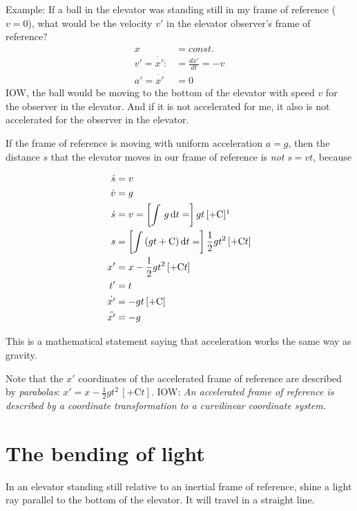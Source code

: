 \documentclass[pagesize,headsepline,10pt,parskip=half,BCOR=12mm]{scrreprt}
\begin{document}
      Example: If a ball in the elevator was standing still in my
      frame of reference ($v = 0$), what would be the velocity $v'$
      in the elevator observer's frame of reference?
      \begin{align}
        x &= const.\\
        v' = \dot{x'} :&= \frac{dx'}{dt} = -v \\
        a' = \ddot{x'} &= 0
      \end{align}
      IOW, the ball would be moving to the bottom of the elevator
      with speed $v$ for the observer in the elevator.  And if it
      is not accelerated for me, it also is not accelerated for the
      observer in the elevator.

      If the frame of reference is moving with uniform
      acceleration $a=g$, then the distance $s$ that the elevator
      moves in our frame of reference is \emph{not} $s = vt$,
      because

      \begin{align}
        \dot{s} &= v \\
        \dot{v} &= g \\
        \dot{s} &= v = \left[\int\, g\,\mathrm{d}t =\right]
        gt\,[+ \mathrm{C}]\footnotemark
        \\
        s &= \left[\int\, (gt + \mathrm{C})\,\mathrm{d}t
        =\right] \frac{1}{2} gt^2\,[+ \mathrm{C}t] \\
        x' &= x - \frac{1}{2} gt^2\,[+ \mathrm{C}t] \\
        t' &= t \\
        \dot{x'} &= -gt\,[+ \mathrm{C}] \\
        \ddot{x'} &= -g
      \end{align}

      This is a mathematical statement saying
      that acceleration works the same way as gravity.

      Note that the $x'$ coordinates of the accelerated frame of
      reference are described by \emph{parabolas}: $x' = x -
      \frac{1}{2} gt^2\,[+ \mathrm{C}t]$. IOW: \emph{An accelerated
      frame of reference is described by a coordinate transformation to a
      curvilinear coordinate system.}

    \section{The bending of light}
      In an elevator standing still relative to an inertial frame
      of reference, shine a light ray parallel to the bottom of
      the elevator.  It will travel in a straight line.
\end{document}
